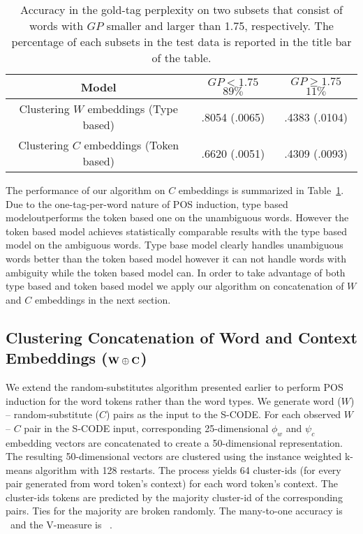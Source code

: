 \begin{table}[h]
\centering
\caption{Accuracy in the gold-tag perplexity on two subsets that consist of words with
  $GP$ smaller and larger than 1.75, respectively.  The percentage of each subsets in
  the test data is reported in the title bar of the table.  
}
\begin{tabular}{|c|c|c|}
  \hline
  Model & \specialcell{$GP < 1.75$\\$89\%$} & \specialcell{$GP \ge 1.75$\\$11\%$}\\
  \hline
  \specialcell{Clustering $W$ embeddings\\(Type based)} & .8054 (.0065) & .4383 (.0104)\\
  \hline
  \specialcell{Clustering $C$ embeddings\\(Token based)} & .6620 (.0051) & .4309 (.0093)\\
  \hline
\end{tabular}
\label{tab:bins}
\end{table}

The performance of our algorithm on $C$ embeddings is summarized in
Table~\ref{tab:bins}.  Due to the one-tag-per-word nature of POS
induction, type based modeloutperforms the token based one on the
unambiguous words.  However the token based model achieves
statistically comparable results with the type based model on the
ambiguous words.  Type base model clearly handles unambiguous words
better than the token based model however it can not handle words with
ambiguity while the token based model can.  In order to take advantage
of both type based and token based model we apply our algorithm on
concatenation of $W$ and $C$ embeddings in the next section.

\subsection{Clustering Concatenation of Word and Context Embeddings (${\bf W}\oplus{\bf C}$)}
\label{sec:clustering-concatenation}

We extend the random-substitutes algorithm presented earlier to
perform POS induction for the word tokens rather than the word types.
We generate word ($W$) -- random-substitute ($C$) pairs as the input
to the S-CODE.  For each observed $W$ -- $C$ pair in the S-CODE input,
corresponding 25-dimensional $\phi_w$ and $\psi_c$ embedding vectors
are concatenated to create a 50-dimensional representation.  The
resulting 50-dimensional vectors are clustered using the instance
weighted k-means algorithm with 128 restarts.  The process yields 64
cluster-ids (for every pair generated from word token's context) for
each word token's context.  The cluster-ids tokens are predicted by
the majority cluster-id of the corresponding pairs.  Ties for the
majority are broken randomly.  The many-to-one accuracy is
\wsxymto\ and the V-measure is \wsxyvm\ .

